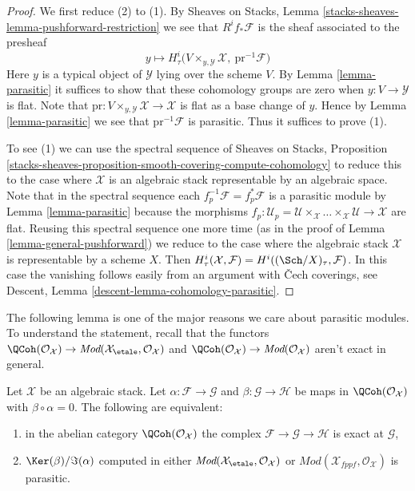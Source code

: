 \begin{proof}
We first reduce (2) to (1).
By Sheaves on Stacks, Lemma \ref{stacks-sheaves-lemma-pushforward-restriction}
we see that $R^if_*\mathcal{F}$ is the sheaf associated to the presheaf
$$
y \longmapsto
H^i_\tau\Big(V \times_{y, \mathcal{Y}} \mathcal{X},
\ \text{pr}^{-1}\mathcal{F}\Big)
$$
Here $y$ is a typical object of $\mathcal{Y}$ lying over the scheme $V$.
By Lemma \ref{lemma-parasitic} it suffices to show that
these cohomology groups are zero when $y : V \to \mathcal{Y}$ is flat.
Note that $\text{pr} : V \times_{y, \mathcal{Y}} \mathcal{X} \to \mathcal{X}$
is flat as a base change of $y$. Hence by
Lemma \ref{lemma-parasitic} we see that $\text{pr}^{-1}\mathcal{F}$
is parasitic. Thus it suffices to prove (1).

\medskip\noindent
To see (1) we can use the spectral sequence of
Sheaves on Stacks, Proposition
\ref{stacks-sheaves-proposition-smooth-covering-compute-cohomology}
to reduce this to the case where $\mathcal{X}$
is an algebraic stack representable by an algebraic space.
Note that in the spectral sequence each
$f_p^{-1}\mathcal{F} = f_p^*\mathcal{F}$ is a parasitic module by
Lemma \ref{lemma-parasitic} because the morphisms
$f_p : \mathcal{U}_p =
\mathcal{U} \times_\mathcal{X} \ldots
\times_\mathcal{X} \mathcal{U} \to \mathcal{X}$ are flat.
Reusing this spectral sequence one more time (as in the
proof of Lemma \ref{lemma-general-pushforward})
we reduce to the case where the
algebraic stack $\mathcal{X}$ is representable by a scheme $X$.
Then $H^i_\tau(\mathcal{X}, \mathcal{F}) = H^i((\Sch/X)_\tau, \mathcal{F})$.
In this case the vanishing follows easily from an argument
with {\v C}ech coverings, see
Descent, Lemma \ref{descent-lemma-cohomology-parasitic}.
\end{proof}

\noindent
The following lemma is one of the major reasons we care about
parasitic modules. To understand the statement, recall that
the functors
$\QCoh(\mathcal{O}_\mathcal{X}) \to
\textit{Mod}(\mathcal{X}_\etale, \mathcal{O}_\mathcal{X})$
and
$\QCoh(\mathcal{O}_\mathcal{X}) \to
\textit{Mod}(\mathcal{O}_\mathcal{X})$
aren't exact in general.

\begin{lemma}
\label{lemma-exact-sequence-quasi-coherent-parasitic-cohomology}
Let $\mathcal{X}$ be an algebraic stack. Let
$\alpha : \mathcal{F} \to \mathcal{G}$ and
$\beta : \mathcal{G} \to \mathcal{H}$
be maps in $\QCoh(\mathcal{O}_\mathcal{X})$ with
$\beta \circ \alpha = 0$. The following are equivalent:
\begin{enumerate}
\item in the abelian category $\QCoh(\mathcal{O}_\mathcal{X})$
the complex $\mathcal{F} \to \mathcal{G} \to \mathcal{H}$
is exact at $\mathcal{G}$,
\item $\Ker(\beta)/\Im(\alpha)$ computed in either
$\textit{Mod}(\mathcal{X}_\etale, \mathcal{O}_\mathcal{X})$ or
$\textit{Mod}(\mathcal{X}_{fppf}, \mathcal{O}_\mathcal{X})$
is parasitic.
\end{enumerate}
\end{lemma}

